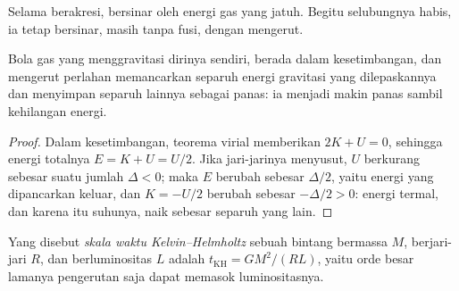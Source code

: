 \begin{omfigure}
\par{}
\end{omfigure}

Selama berakresi,  bersinar oleh energi gas yang jatuh. Begitu
selubungnya habis, ia tetap bersinar, masih tanpa fusi, dengan
mengerut.

\begin{proposition}
\label{prop:b2:ism-star-formation:contraction}
Bola gas yang menggravitasi dirinya sendiri, berada dalam kesetimbangan, dan mengerut
perlahan memancarkan separuh energi gravitasi yang dilepaskannya dan menyimpan separuh
lainnya sebagai panas: ia menjadi makin panas sambil kehilangan energi.
\end{proposition}

\begin{proof}
Dalam kesetimbangan, teorema virial memberikan $2K + U = 0$, sehingga energi totalnya
$E = K + U = U/2$. Jika jari-jarinya menyusut, $U$ berkurang sebesar suatu jumlah
$\Delta < 0$; maka $E$ berubah sebesar $\Delta/2$, yaitu energi yang dipancarkan
keluar, dan $K = -U/2$ berubah sebesar $-\Delta/2 > 0$: energi termal, dan karena itu
suhunya, naik sebesar separuh yang lain.
\end{proof}

\begin{definition}\label{def:b2:ism-star-formation:kh-time}
Yang disebut \emph{skala waktu Kelvin--Helmholtz}
sebuah bintang bermassa $M$, berjari-jari $R$, dan berluminositas $L$ adalah
$t_{\mathrm{KH}} = GM^2/(RL)$, yaitu orde besar lamanya pengerutan saja dapat
memasok luminositasnya.
\end{definition}

